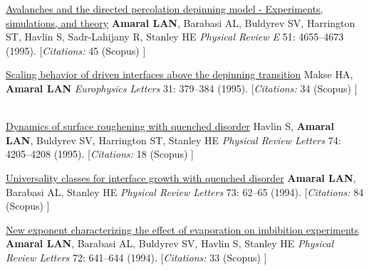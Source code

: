 \NumberedItem{\makebox[0.8cm][r]{[6]}}
\href{/people/amaral/avalanches-and-the-directed-percolation-depinning-model-experiments-simulations-and-theory}
{Avalanches and the directed percolation depinning model - Experiments, simulations, and theory}
\newline
{\textbf{Amaral LAN}}, Barabasi AL, Buldyrev SV, Harrington ST, Havlin S, Sadr-Lahijany R, Stanley HE
\newline
\textit{Physical Review E}
    51:
4655--4673 (1995).
    [{\em{Citations:}}  45 (Scopus) ]
\newline
\Gap
~
\Gap

\NumberedItem{\makebox[0.8cm][r]{[5]}}
\href{/people/amaral/scaling-behavior-of-driven-interfaces-above-the-depinning-transition}
{Scaling behavior of driven interfaces above the depinning transition}
\newline
Makse HA, {\textbf{Amaral LAN}}
\newline
\textit{Europhysics Letters}
    31:
379--384 (1995).
    [{\em{Citations:}}  34 (Scopus) ]
\newline
\Gap
~
\Gap

\NumberedItem{\makebox[0.8cm][r]{[4]}}
\href{/people/amaral/dynamics-of-surface-roughening-with-quenched-disorder}
{Dynamics of surface roughening with quenched disorder}
\newline
Havlin S, {\textbf{Amaral LAN}}, Buldyrev SV, Harrington ST, Stanley HE
\newline
\textit{Physical Review Letters}
    74:
4205--4208 (1995).
    [{\em{Citations:}}  18 (Scopus) ]
\newline
\Gap
~
\Gap

\NumberedItem{\makebox[0.8cm][r]{[3]}}
\href{/people/amaral/universality-classes-for-interface-growth-with-quenched-disorder}
{Universality classes for interface growth with quenched disorder}
\newline
{\textbf{Amaral LAN}}, Barabasi AL, Stanley HE
\newline
\textit{Physical Review Letters}
    73:
62--65 (1994).
    [{\em{Citations:}}  84 (Scopus) ]
\newline
\Gap
~
\Gap

\NumberedItem{\makebox[0.8cm][r]{[2]}}
\href{/people/amaral/new-exponent-characterizing-the-effect-of-evaporation-on-imbibition-experiments}
{New exponent characterizing the effect of evaporation on imbibition experiments}
\newline
{\textbf{Amaral LAN}}, Barabasi AL, Buldyrev SV, Havlin S, Stanley HE
\newline
\textit{Physical Review Letters}
    72:
641--644 (1994).
    [{\em{Citations:}}  33 (Scopus) ]
\newline
\Gap
~
\Gap

